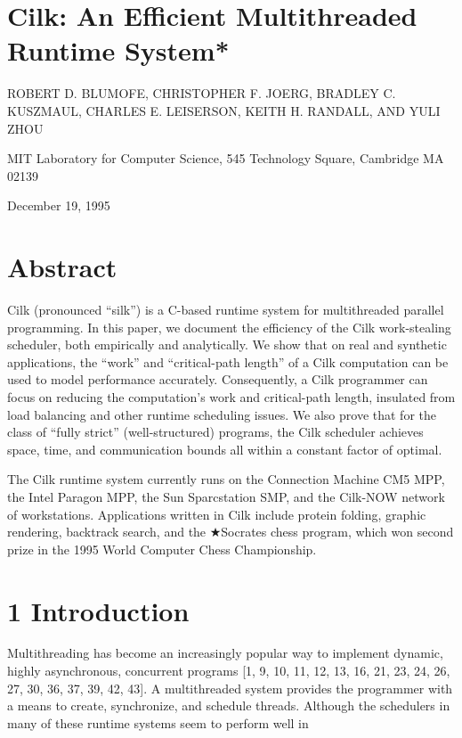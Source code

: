\documentclass[
]{article}
\author{}
\date{}
\begin{document}
\section{Cilk: An Efficient Multithreaded Runtime
System*}\label{cilk-an-efficient-multithreaded-runtime-system}

ROBERT D. BLUMOFE, CHRISTOPHER F. JOERG, BRADLEY C. KUSZMAUL, CHARLES E.
LEISERSON, KEITH H. RANDALL, AND YULI ZHOU

MIT Laboratory for Computer Science, 545 Technology Square, Cambridge MA
02139

December 19, 1995

\section{Abstract}\label{abstract}

Cilk (pronounced ``silk'') is a C-based runtime system for multithreaded
parallel programming. In this paper, we document the efficiency of the
Cilk work-stealing scheduler, both empirically and analytically. We show
that on real and synthetic applications, the ``work'' and
``critical-path length'' of a Cilk computation can be used to model
performance accurately. Consequently, a Cilk programmer can focus on
reducing the computation's work and critical-path length, insulated from
load balancing and other runtime scheduling issues. We also prove that
for the class of ``fully strict'' (well-structured) programs, the Cilk
scheduler achieves space, time, and communication bounds all within a
constant factor of optimal.

The Cilk runtime system currently runs on the Connection Machine CM5
MPP, the Intel Paragon MPP, the Sun Sparcstation SMP, and the Cilk-NOW
network of workstations. Applications written in Cilk include protein
folding, graphic rendering, backtrack search, and the ★Socrates chess
program, which won second prize in the 1995 World Computer Chess
Championship.

\section{1 Introduction}\label{introduction}

Multithreading has become an increasingly popular way to implement
dynamic, highly asynchronous, concurrent programs {[}1, 9, 10, 11, 12,
13, 16, 21, 23, 24, 26, 27, 30, 36, 37, 39, 42, 43{]}. A multithreaded
system provides the programmer with a means to create, synchronize, and
schedule threads. Although the schedulers in many of these runtime
systems seem to perform well in
\end{document}
